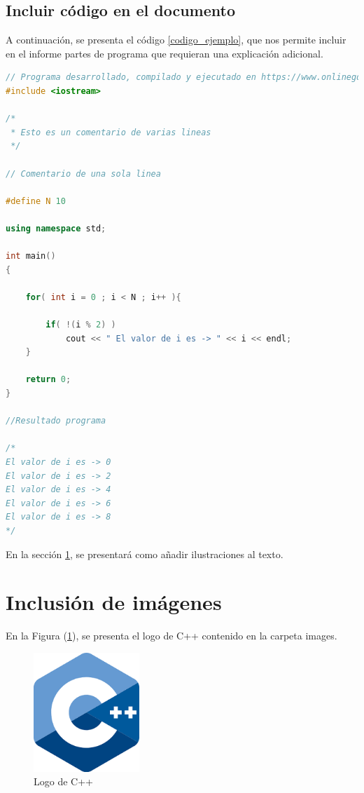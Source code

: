 \documentclass{article}
\begin{document}
\subsection{Incluir código en el documento}
%
A continuación, se presenta el código \ref{codigo_ejemplo}, que nos permite incluir en el informe partes de programa que requieran una explicación adicional.
\begin{lstlisting}[language=C++, label=codigo_ejemplo]
// Programa desarrollado, compilado y ejecutado en https://www.onlinegdb.com
#include <iostream>

/*
 * Esto es un comentario de varias lineas
 */

// Comentario de una sola linea

#define N 10

using namespace std;

int main()
{
    
    for( int i = 0 ; i < N ; i++ ){
        
        if( !(i % 2) )
            cout << " El valor de i es -> " << i << endl;
    }
    
    return 0;
}

//Resultado programa

/*
El valor de i es -> 0
El valor de i es -> 2
El valor de i es -> 4
El valor de i es -> 6
El valor de i es -> 8
*/
\end{lstlisting}
En la sección \ref{imagenes}, se presentará como añadir ilustraciones al texto.

\section{Inclusión de imágenes} \label{imagenes}

En la Figura (\ref{fig:cpplogo}), se presenta el logo de C++ contenido en la carpeta images.

\begin{figure}[h]
\includegraphics[width=4cm]{cpplogo.png}
\centering
\caption{Logo de C++}
\label{fig:cpplogo}
\end{figure}
\end{document}
